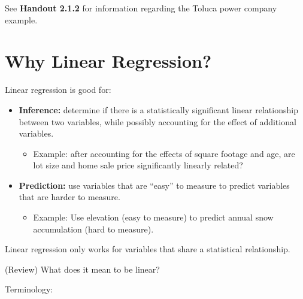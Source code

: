 \documentclass[12pt]{notes}
\begin{document}

See \textbf{Handout 2.1.2} for information regarding the Toluca power company example.

\section{Why Linear Regression?}

\nspace
Linear regression is good for: 
\begin{itemize}
\item \textbf{Inference:} determine if there is a statistically significant linear relationship between two variables, while possibly accounting for the effect of additional variables. 
\begin{itemize}
\item Example: after accounting for the effects of square footage and age, are lot size and home sale price significantly linearly related?  
\end{itemize} 
\item \textbf{Prediction:} use variables that are ``easy'' to measure to predict variables that are harder to measure.  
\begin{itemize}
\item Example: Use elevation (easy to measure) to predict annual snow accumulation (hard to measure). 
\end{itemize} 
\end{itemize}

\nspace
Linear regression only works for variables that share a statistical relationship.

\nspace
{}

\begin{minipage}[l][3cm][c]{\textwidth}

\end{minipage}

\nspace
(Review) What does it mean to be linear?

\nspace

\nspace
Terminology: 
\end{document}
